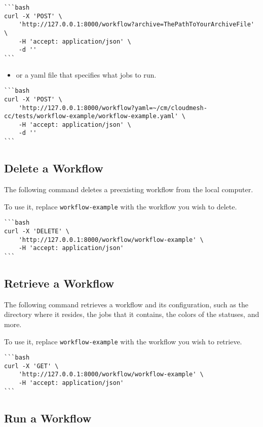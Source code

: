 \begin{verbatim}
```bash
curl -X 'POST' \
    'http://127.0.0.1:8000/workflow?archive=ThePathToYourArchiveFile' \
    -H 'accept: application/json' \
    -d ''
```
\end{verbatim}

\begin{itemize}
\tightlist
\item
  or a yaml file that specifies what jobs to run.
\end{itemize}

\begin{verbatim}
```bash
curl -X 'POST' \
    'http://127.0.0.1:8000/workflow?yaml=~/cm/cloudmesh-cc/tests/workflow-example/workflow-example.yaml' \
    -H 'accept: application/json' \
    -d ''
```
\end{verbatim}

\subsection{Delete a Workflow}\label{delete-a-workflow}

The following command deletes a preexisting workflow from the local
computer.

To use it, replace \texttt{workflow-example} with the workflow you wish
to delete.

\begin{verbatim}
```bash
curl -X 'DELETE' \
    'http://127.0.0.1:8000/workflow/workflow-example' \
    -H 'accept: application/json'
```
\end{verbatim}

\subsection{Retrieve a Workflow}\label{retrieve-a-workflow}

The following command retrieves a workflow and its configuration, such
as the directory where it resides, the jobs that it contains, the colors
of the statuses, and more.

To use it, replace \texttt{workflow-example} with the workflow you wish
to retrieve.

\begin{verbatim}
```bash
curl -X 'GET' \
    'http://127.0.0.1:8000/workflow/workflow-example' \
    -H 'accept: application/json'
```
\end{verbatim}

\subsection{Run a Workflow}\label{run-a-workflow}

